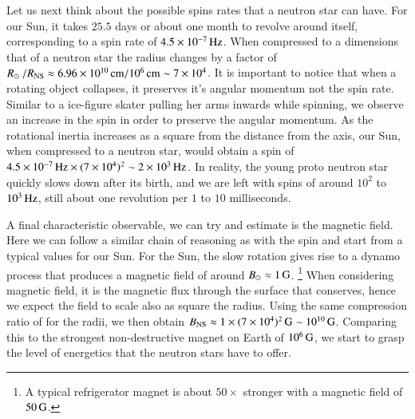 Let us next think about the possible spins rates that a neutron star can have.
For our Sun, it takes $25.5$ days or about one month to revolve around itself, corresponding to a spin rate of $4.5 \times 10^{-7}\, \mathrm{Hz}$.
When compressed to a dimensions that of a neutron star the radius changes by a factor of $R_{\odot} / R_{\mathrm{NS}} \approx \Ten{6.96}{10}\cm / 10^6 \cm \sim \Ten{7}{4}$.
It is important to notice that when a rotating object collapses, it preserves it's angular momentum not the spin rate.
Similar to a ice-figure skater pulling her arms inwards while spinning, we observe an increase in the spin in order to preserve the angular momentum.
As the rotational inertia increases as a square from the distance from the axis, our Sun, when compressed to a neutron star, would obtain a spin of $4.5 \times 10^{-7}\, \mathrm{Hz} \times (7 \times 10^{4})^2 \sim 2 \times 10^{3} \, \mathrm{Hz}$.
In reality, the young proto neutron star quickly slows down after its birth, and we are left with spins of around $10^2$ to $10^3 \, \mathrm{Hz}$, still about one revolution per $1$ to $10$ milliseconds.




A final characteristic observable, we can try and estimate is the magnetic field.
Here we can follow a similar chain of reasoning as with the spin and start from a typical values for our Sun.
For the Sun, the slow rotation gives rise to a dynamo process that produces a magnetic field of around $B_{\odot} \approx 1\, \mathrm{G}$.%
\footnote{A typical refrigerator magnet is about $50\times$ stronger with a magnetic field of $50\, \mathrm{G}$.}
When considering magnetic field, it is the magnetic flux through the surface that conserves, hence we expect the field to scale also as square the radius.
Using the same compression ratio of  for the radii, we then obtain $B_{\mathrm{NS}} \approx 1 \times (7 \times 10^{4})^2 \, \mathrm{G} \sim 10^{10} \, \mathrm{G}$.
Comparing this to the strongest non-destructive magnet on Earth of $10^6\, \mathrm{G}$, we start to grasp the level of energetics that the neutron stars have to offer.




